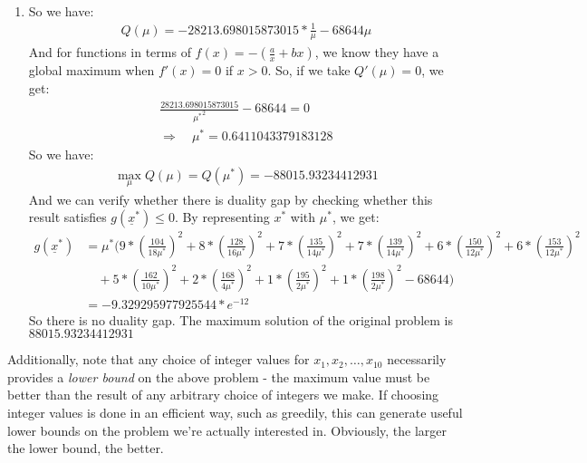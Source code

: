 \documentclass[11pt,letterpaper]{article}
\begin{document}
\begin{tcolorbox}
\begin{itemize}
\begin{align*}
        \end{align*}
    \end{itemize}
\end{tcolorbox}

\newpage

\begin{tcolorbox}
    \begin{enumerate}[\quad\quad]
        \item So we have:
        \begin{align*}
            Q(\mu) = -28213.698015873015 * \frac{1}{\mu} - 68644\mu
        \end{align*}
        And for functions in terms of $f(x) = -(\frac{a}{x} + bx)$, we know they have a global maximum when $f'(x) = 0$ if $x>0$. So, if we take $Q'(\mu)=0$, we get:
        \begin{align*}
            \frac{28213.698015873015}{{\mu^\ast}^2} - 68644 = 0
            \\
            \Rightarrow \quad \mu^\ast = 0.6411043379183128 
        \end{align*}
        So we have:
        \begin{align*}
            \max_{\mu} Q(\mu) = Q(\mu^\ast) = -88015.93234412931
        \end{align*}
        And we can verify whether there is duality gap by checking whether this result satisfies $g(\underline x^\ast) \leq 0$. By representing $x^\ast$ with $\mu^\ast$, we get:
        \begin{align*}
            g(\underline x^\ast) &= 
            \mu^\ast(9 * (\frac{104}{18\mu^\ast})^2 + 8 * (\frac{128}{16\mu^\ast})^2 + 7* (\frac{135}{14\mu^\ast})^2 + 7 * (\frac{139}{14\mu^\ast})^2 + 6 * (\frac{150}{12\mu^\ast})^2 + 6 * (\frac{153}{12\mu^\ast})^2 \\ &\quad + 5 * (\frac{162}{10\mu^\ast})^2 + 2 * (\frac{168}{4\mu^\ast})^2 + 1 * (\frac{195}{2\mu^\ast})^2 + 1 * (\frac{198}{2\mu^\ast})^2 - 68644)\\
            &= -9.329295977925544 * e^{-12}
        \end{align*}
        So there is no duality gap. The maximum solution of the original problem is $88015.93234412931$
    \end{enumerate}
\end{tcolorbox}
\begin{flushleft}
    \justifying
    Additionally, note that any choice of integer values for $x_1, x_2, \dots, x_{10}$ necessarily provides a \textit{lower bound} on the above problem - the maximum value must be better than the result of any arbitrary choice of integers we make. If choosing integer values is done in an efficient way, such as greedily, this can generate useful lower bounds on the problem we’re actually interested in. Obviously, the larger the lower bound, the better.
\end{flushleft}
\end{document}
